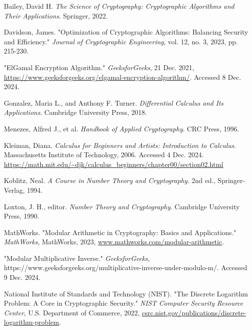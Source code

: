 \documentclass[12pt]{article}
\begin{document}

\newpage

\renewcommand{\refname}{Works Cited}
\begin{thebibliography}{9}

Bailey, David H. \textit{The Science of Cryptography: Cryptographic Algorithms and Their Applications}. Springer, 2022.

Davidson, James. "Optimization of Cryptographic Algorithms: Balancing Security and Efficiency." \textit{Journal of Cryptographic Engineering}, vol. 12, no. 3, 2023, pp. 215-230.

"ElGamal Encryption Algorithm." \textit{GeeksforGeeks}, 21 Dec. 2021, \url{https://www.geeksforgeeks.org/elgamal-encryption-algorithm/}. Accessed 8 Dec. 2024.

Gonzalez, Maria L., and Anthony F. Turner. \textit{Differential Calculus and Its Applications}. Cambridge University Press, 2018.

Menezes, Alfred J., et al. \textit{Handbook of Applied Cryptography}. CRC Press, 1996.

Kleiman, Diana. \textit{Calculus for Beginners and Artists: Introduction to Calculus}. Massachusetts Institute of Technology, 2006. Accessed 4 Dec. 2024. \url{https://math.mit.edu/~djk/calculus\_beginners/chapter00/section02.html}

Koblitz, Neal. \textit{A Course in Number Theory and Cryptography}. 2nd ed., Springer-Verlag, 1994.

Loxton, J. H., editor. \textit{Number Theory and Cryptography}. Cambridge University Press, 1990.

MathWorks. "Modular Arithmetic in Cryptography: Basics and Applications." \textit{MathWorks}, MathWorks, 2023, \url{www.mathworks.com/modular-arithmetic}.

"Modular Multiplicative Inverse." \textit{GeeksforGeeks}, https://www.geeksforgeeks.org/multiplicative-inverse-under-modulo-m/. Accessed 9 Dec. 2024.

National Institute of Standards and Technology (NIST). "The Discrete Logarithm Problem: A Core in Cryptographic Security." \textit{NIST Computer Security Resource Center}, U.S. Department of Commerce, 2022, \url{csrc.nist.gov/publications/discrete-logarithm-problem}.


\end{thebibliography}
\end{document}
